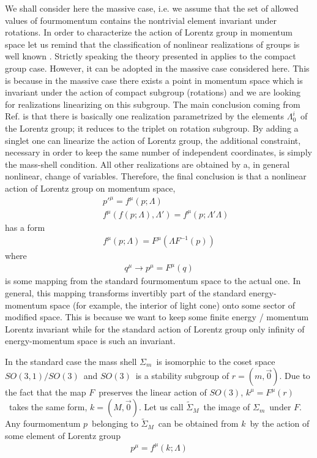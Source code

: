 \documentclass[a4paper,12pt]{article}
\begin{document}
We shall consider here the massive case, i.e. we assume that the set of allowed values of fourmomentum contains
the nontrivial element invariant under rotations. In order to characterize the action of Lorentz group in momentum
space let us remind that the classification of nonlinear realizations of groups is well known \cite{b22}.
Strictly speaking the theory presented in \cite{b22} applies to the compact group case. However, it can be adopted in 
the massive case considered here. This is because in the massive case there exists a point in momentum space which 
is invariant under the action of compact subgroup (rotations) and we are looking for realizations linearizing on this 
subgroup. The main conclusion coming from Ref.\cite{b22} is that there is basically  one realization parametrized by the 
elements $\Lambda^i_0$\ of the Lorentz group; it reduces to the triplet on rotation subgroup. By adding a singlet one
can linearize the action of Lorentz group, the additional constraint, necessary in order to keep the same number of 
independent coordinates, is simply the mass-shell condition. All other realizations are obtained by a, in 
general nonlinear, change of variables. Therefore, the final conclusion is that a nonlinear action of Lorentz group
on momentum space, 
\begin{eqnarray}
&&p'^{\mu}=f^{\mu}(p;\Lambda ) \label{w1} \\
&&f{^\mu}(f(p;\Lambda ),\Lambda ')=f^{\mu}(p;\Lambda '\Lambda )\nonumber 
\end{eqnarray}
has a form
\begin{eqnarray}
f^{\mu}(p;\Lambda )=F^{\mu}(\Lambda F^{-1}(p)) \label{w2}
\end{eqnarray}
where
\begin{eqnarray}
q^{\mu}\rightarrow p^{\mu}=F^{\mu}(q) \label{w3}
\end{eqnarray}
is some mapping from the standard fourmomentum space to the actual one. In general, this mapping transforms
 invertibly part of the standard energy-momentum space (for example, the interior of light cone) onto some sector of
modified space. This is because we want to keep some finite energy / momentum Lorentz invariant while for the
standard action of Lorentz group only infinity of energy-momentum space is such an invariant.

In the standard case the mass shell $\Sigma_m $\ is isomorphic to the coset space $SO(3,1)/SO(3)$\ and $SO(3)$\ is
a stability subgroup of $r=(m,\vec{0})$. Due to the fact that the map $F$\ preserves the linear action of $SO(3)$, 
$k^{\mu}=F^{\mu}(r)$\ takes the same form, $k=(M,\vec{0})$. Let us call $\tilde{\Sigma}_M$\ 
the image of $\Sigma_m$\ under $F$. Any
fourmomentum $p$\ belonging to $\tilde{\Sigma}_M$\ can be obtained from $k$\ by the action of some element
of Lorentz group
\begin{eqnarray}
p^{\mu}=f^{\mu}(k;\Lambda )\label{w4}
\end{eqnarray}
\end{document}
